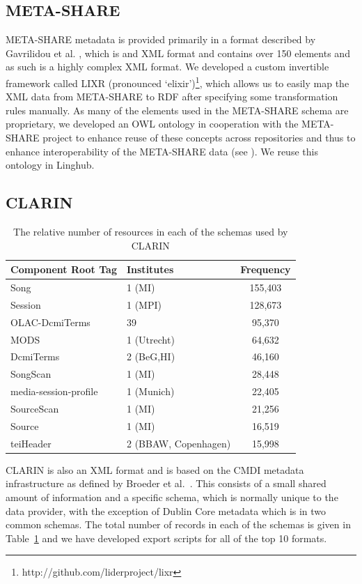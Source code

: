 \documentclass[smallextended]{svjour3}       %
\begin{document}
\subsection{META-SHARE}

META-SHARE metadata is provided primarily in a format described by
Gavrilidou et al. \cite{gavrilidou2012meta}, which is
and XML format and contains over 150 elements and as such is a highly complex XML
format. We developed a custom invertible framework called LIXR (pronounced
`elixir')\footnote{http://github.com/liderproject/lixr}, which allows us to
easily map the XML data from META-SHARE to RDF after specifying some
transformation rules manually.  As many of the elements used in the META-SHARE
schema are proprietary, we developed an OWL ontology in cooperation with the
META-SHARE project to enhance reuse of these concepts across repositories and
thus to enhance interoperability of the META-SHARE data (see
\cite{mccrae2015ontology}). We reuse this ontology in Linghub. 

\subsection{CLARIN}

\begin{table}
\begin{tabular}{llc}
    \toprule
Component Root Tag & Institutes & Frequency \\
\midrule
Song & 1 (MI) & 155,403 \\
Session & 1 (MPI) & 128,673 \\
OLAC-DcmiTerms & 39 & 95,370 \\
MODS & 1 (Utrecht)& 64,632 \\
DcmiTerms & 2 (BeG,HI) & 46,160 \\
SongScan & 1 (MI) & 28,448 \\
media-session-profile & 1 (Munich) & 22,405 \\
SourceScan & 1 (MI) & 21,256 \\
Source & 1 (MI) & 16,519 \\
teiHeader & 2 (BBAW, Copenhagen) & 15,998 \\
\bottomrule
\end{tabular}
    \caption{\label{tab:clarin-resources}The relative number of resources in
    each of the schemas used by CLARIN}
\end{table}

CLARIN is also an XML format and is based on the CMDI metadata infrastructure as
defined by Broeder et al.~\cite{broeder2012cmdi}. This consists of a small shared amount of information and
a specific schema, which is normally unique to the data provider, with the
exception of Dublin Core metadata which is in two common schemas. The total 
number of records in each of the schemas is given in Table~\ref{tab:clarin-resources} 
and we have developed export scripts for all of the
top 10 formats.
\end{document}
